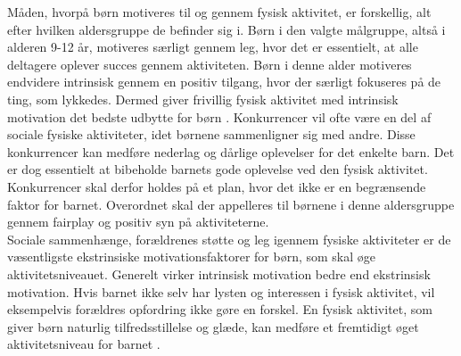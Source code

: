 Måden, hvorpå børn motiveres til og gennem fysisk aktivitet, er forskellig, alt efter hvilken aldersgruppe de befinder sig i. Børn i den valgte målgruppe, altså i alderen 9-12 år, motiveres særligt gennem leg, hvor det er essentielt, at alle deltagere oplever succes gennem aktiviteten. Børn i denne alder motiveres endvidere intrinsisk gennem en positiv tilgang, hvor der særligt fokuseres på de ting, som lykkedes. \citep{Wied2011} Dermed giver frivillig fysisk aktivitet med intrinsisk motivation det bedste udbytte for børn \citep{J.Sebire2013}. Konkurrencer vil ofte være en del af sociale fysiske aktiviteter, idet børnene sammenligner sig med andre. Disse konkurrencer kan medføre nederlag og dårlige oplevelser for det enkelte barn. Det er dog essentielt at bibeholde barnets gode oplevelse ved den fysisk aktivitet. Konkurrencer skal derfor holdes på et plan, hvor det ikke er en begrænsende faktor for barnet. Overordnet skal der appelleres til børnene i denne aldersgruppe gennem fairplay og positiv syn på aktiviteterne. \citep{Wied2011}\\
Sociale sammenhænge, forældrenes støtte og leg igennem fysiske aktiviteter er de væsentligste ekstrinsiske motivationsfaktorer for børn, som skal øge aktivitetsniveauet. Generelt virker intrinsisk motivation bedre end ekstrinsisk motivation. Hvis barnet ikke selv har lysten og interessen i fysisk aktivitet, vil eksempelvis forældres opfordring ikke gøre en forskel. \citep{J.Sebire2013,McWhorter2003} En fysisk aktivitet, som giver børn naturlig tilfredsstillelse og glæde, kan medføre et fremtidigt øget aktivitetsniveau for barnet \citep{Romani2013}.

